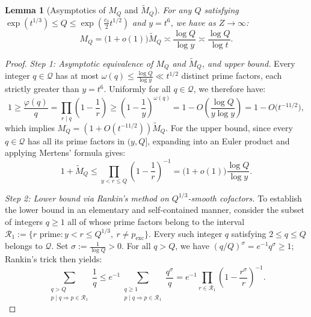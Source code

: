 \documentclass[11pt, a4paper]{article}
\theoremstyle{plain}
\newtheorem{lemma}[theorem]{Lemma}
\theoremstyle{definition}
\begin{document}
\begin{lemma}[Asymptotics of $M_Q$ and $\widetilde{M}_Q$]\label{lem:evaluation_MQ_Rankin}
For any $Q$ satisfying $\exp(t^{1/3}) \le Q \le \exp(\frac{c_3}{2} t^{1/2})$ and $y = t^6$, we have as $Z \to \infty$:
\begin{equation}\label{eq:equiv_MQ}
M_Q = \big(1 + o(1)\big)\widetilde{M}_Q \asymp \frac{\log Q}{\log y} \asymp \frac{\log Q}{\log t}.
\end{equation}
\end{lemma}
\begin{proof}
\emph{Step 1: Asymptotic equivalence of $M_Q$ and $\widetilde{M}_Q$, and upper bound.} Every integer $q \in \mathcal{Q}$ has at most $\omega(q) \le \frac{\log Q}{\log y} \ll t^{1/2}$ distinct prime factors, each strictly greater than $y = t^6$. Uniformly for all $q \in \mathcal{Q}$, we therefore have:
\[
1 \ge \frac{\varphi(q)}{q} = \prod_{r \mid q}\left(1 - \frac{1}{r}\right) \ge \left(1 - \frac{1}{y}\right)^{\omega(q)} = 1 - O\!\left(\frac{\log Q}{y \log y}\right) = 1 - O\big(t^{-11/2}\big),
\]
which implies $M_Q = (1 + O(t^{-11/2}))\widetilde{M}_Q$. For the upper bound, since every $q \in \mathcal{Q}$ has all its prime factors in $(y, Q]$, expanding into an Euler product and applying Mertens' formula gives:
\[
1 + \widetilde{M}_Q \le \prod_{y < r \le Q}\left(1 - \frac{1}{r}\right)^{-1} = \big(1 + o(1)\big)\frac{\log Q}{\log y}.
\]

\medskip\noindent
\emph{Step 2: Lower bound via Rankin's method on $Q^{1/3}$-smooth cofactors.} To establish the lower bound in an elementary and self-contained manner, consider the subset of integers $q \ge 1$ all of whose prime factors belong to the interval $\mathcal{R}_1 := \{r \text{ prime} : y < r \le Q^{1/3},\ r \ne p_{\mathrm{exc}}\}$. Every such integer $q$ satisfying $2 \le q \le Q$ belongs to $\mathcal{Q}$. Set $\sigma := \frac{1}{\log Q} > 0$. For all $q > Q$, we have $(q/Q)^\sigma = e^{-1} q^\sigma \ge 1$; Rankin's trick then yields:
\begin{equation}\label{eq:Rankin_borne_queue}
\sum_{\substack{q > Q \\ p \mid q \Rightarrow p \in \mathcal{R}_1}} \frac{1}{q} \le e^{-1} \sum_{\substack{q \ge 1 \\ p \mid q \Rightarrow p \in \mathcal{R}_1}} \frac{q^\sigma}{q} = e^{-1} \prod_{r \in \mathcal{R}_1} \left(1 - \frac{r^\sigma}{r}\right)^{-1}.
\end{equation}


\end{proof}
\end{document}
